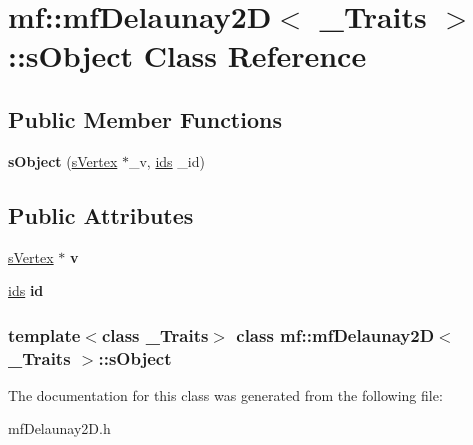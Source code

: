 \hypertarget{classmf_1_1mfDelaunay2D_1_1sObject}{
\section{mf::mfDelaunay2D$<$ \_\-Traits $>$::sObject Class Reference}
\label{classmf_1_1mfDelaunay2D_1_1sObject}
}
\subsection*{Public Member Functions}
\begin{DoxyCompactItemize}
\item 
\hypertarget{classmf_1_1mfDelaunay2D_1_1sObject_ab7f3c45c96326b694c3aca4c8b86328f}{
{\bfseries sObject} (\hyperlink{classmf_1_1mfDelaunay2D_a6459b2d8aa82aedabc7be094a80fac5f}{sVertex} $\ast$\_\-v, \hyperlink{classmf_1_1mfDelaunay2D_af821015a498654435308272878e686f2}{ids} \_\-id)}
\label{classmf_1_1mfDelaunay2D_1_1sObject_ab7f3c45c96326b694c3aca4c8b86328f}

\end{DoxyCompactItemize}
\subsection*{Public Attributes}
\begin{DoxyCompactItemize}
\item 
\hypertarget{classmf_1_1mfDelaunay2D_1_1sObject_a38973d89f26ded099e59325e31808cd2}{
\hyperlink{classmf_1_1mfDelaunay2D_a6459b2d8aa82aedabc7be094a80fac5f}{sVertex} $\ast$ {\bfseries v}}
\label{classmf_1_1mfDelaunay2D_1_1sObject_a38973d89f26ded099e59325e31808cd2}

\item 
\hypertarget{classmf_1_1mfDelaunay2D_1_1sObject_abbcf2c4f0f09f9d39010b2dbd796bfc0}{
\hyperlink{classmf_1_1mfDelaunay2D_af821015a498654435308272878e686f2}{ids} {\bfseries id}}
\label{classmf_1_1mfDelaunay2D_1_1sObject_abbcf2c4f0f09f9d39010b2dbd796bfc0}

\end{DoxyCompactItemize}
\subsubsection*{template$<$class \_\-Traits$>$ class mf::mfDelaunay2D$<$ \_\-Traits $>$::sObject}



The documentation for this class was generated from the following file:\begin{DoxyCompactItemize}
\item 
mfDelaunay2D.h\end{DoxyCompactItemize}
